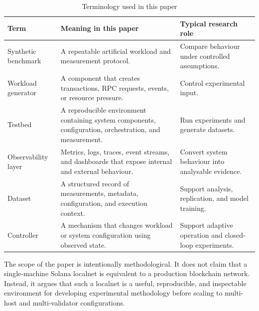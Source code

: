 \documentclass[11pt,a4paper]{article}
\begin{document}
\begin{table}[H]
\centering
\caption{Terminology used in this paper}
\label{tab:terminology}
\begin{tabularx}{\textwidth}{L{3.2cm}Y Y}
\toprule
\textbf{Term} & \textbf{Meaning in this paper} & \textbf{Typical research role} \\
\midrule
Synthetic benchmark & A repeatable artificial workload and measurement protocol. & Compare behaviour under controlled assumptions. \\
Workload generator & A component that creates transactions, RPC requests, events, or resource pressure. & Control experimental input. \\
Testbed & A reproducible environment containing system components, configuration, orchestration, and measurement. & Run experiments and generate datasets. \\
Observability layer & Metrics, logs, traces, event streams, and dashboards that expose internal and external behaviour. & Convert system behaviour into analysable evidence. \\
Dataset & A structured record of measurements, metadata, configuration, and execution context. & Support analysis, replication, and model training. \\
Controller & A mechanism that changes workload or system configuration using observed state. & Support adaptive operation and closed-loop experiments. \\
\bottomrule
\end{tabularx}
\end{table}

The scope of the paper is intentionally methodological. It does not claim that a single-machine Solana localnet is equivalent to a production blockchain network. Instead, it argues that such a localnet is a useful, reproducible, and inspectable environment for developing experimental methodology before scaling to multi-host and multi-validator configurations.
\end{document}
